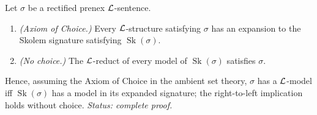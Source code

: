 \begin{theorem}
\label{thm:skolem-equisatisfiable}
Let \(\sigma\) be a rectified prenex \(\mathcal{L}\)-sentence.
\begin{enumerate}
  \item \emph{(Axiom of Choice.)}  Every \(\mathcal{L}\)-structure satisfying
        \(\sigma\) has an expansion to the Skolem signature satisfying
        \(\operatorname{Sk}(\sigma)\).
  \item \emph{(No choice.)}  The \(\mathcal{L}\)-reduct of every model of
        \(\operatorname{Sk}(\sigma)\) satisfies \(\sigma\).
\end{enumerate}
Hence, assuming the Axiom of Choice in the ambient set theory, \(\sigma\)
has a \(\mathcal{L}\)-model iff \(\operatorname{Sk}(\sigma)\) has a model in its
expanded signature; the right-to-left implication holds without choice.
\textit{Status: complete proof.}
\end{theorem}

